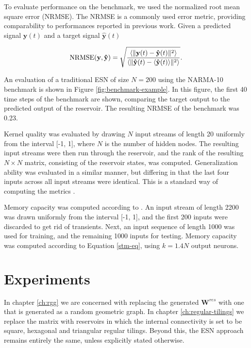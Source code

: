 To evaluate performance on the benchmark, we used the normalized root mean
square error (NRMSE). The NRMSE is a commonly used error metric, providing
comparability to performances reported in previous work. Given a predicted
signal $\mathbf{y}(t)$ and a target signal $\mathbf{\hat{y}}(t)$

\begin{equation}
  \textrm{NRMSE}(\mathbf{y}, \mathbf{\hat{y}}) = \sqrt{\frac{
      \langle\Vert \mathbf{y}(t) - \mathbf{\hat{y}}(t) \Vert^{2}\rangle
    }{
      \langle\Vert \mathbf{\hat{y}}(t) - \langle\mathbf{\hat{y}}(t)\rangle \Vert^{2}\rangle
    }
  }
  .
  \label{eq:nrmse}
\end{equation}

An evaluation of a traditional ESN of size $N = 200$ using the NARMA-10
benchmark is shown in Figure \ref{fig:benchmark-example}. In this figure, the
first 40 time steps of the benchmark are shown, comparing the target output to
the predicted output of the reservoir. The resulting NRMSE of the benchmark was
0.23.

Kernel quality was evaluated by drawing $N$ input streams of length 20 uniformly
from the interval [-1, 1], where $N$ is the number of hidden nodes. The
resulting input streams were then run through the reservoir, and the rank of the
resulting $N \times N$ matrix, consisting of the reservoir states, was
computed. Generalization ability was evaluated in a similar manner, but
differing in that the last four inputs across all input streams were
identical. This is a standard way of computing the metrics
\cite{busing_connectivity_2010}.

Memory capacity was computed according to \cite{farkas_computational_2016}. An
input stream of length 2200 was drawn uniformly from the interval [-1, 1], and
the first 200 inputs were discarded to get rid of transients. Next, an input
sequence of length 1000 was used for training, and the remaining 1000 inputs for
testing. Memory capacity was computed according to Equation \ref{stm-eq}, using
$k = 1.4N$ output neurons.

\section{Experiments}

In chapter \ref{ch:rgg} we are concerned with replacing the generated
$\mathbf{W}^{res}$ with one that is generated as a random geometric graph. In
chapter \ref{ch:regular-tilings} we replace the matrix with reservoirs in which
the internal connectivity is set to be square, hexagonal and triangular regular
tilings. Beyond this, the ESN approach remains entirely the same, unless
explicitly stated otherwise.

